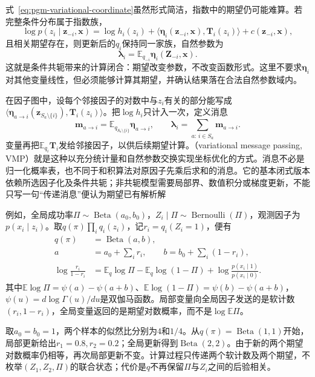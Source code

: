 式~\eqref{eq:pgm-variational-coordinate}虽然形式简洁，指数中的期望仍可能难算。若完整条件分布属于指数族，
\[
  \log p(z_i\mid\bm{z}_{-i},\bm{x})
    =\log h_i(z_i)
      +\langle\bm{\eta}_i(\bm{z}_{-i},\bm{x}),\bm T_i(z_i)\rangle
      +c(\bm{z}_{-i},\bm{x}),
\]
且相关期望存在，则更新后的$q_i$保持同一家族，自然参数为
\begin{equation}
  \bm{\lambda}_i
    =\mathbb E_{q_{-i}}\bm{\eta}_i(\bm{Z}_{-i},\bm{x}).
  \label{eq:pgm-variational-conjugacy}
\end{equation}
这就是条件共轭带来的计算闭合：期望改变参数，不改变函数形式。这里不要求$\bm{\eta}_i$对其他变量线性，但必须能够计算其期望，并确认结果落在合法自然参数域内。

在因子图中，设每个邻接因子的对数中与$z_i$有关的部分能写成$\langle\bm{\eta}_{a\to i}(\bm z_{S_a\setminus\{i\}}),\bm T_i(z_i)\rangle$。把$\log h_i$只计入一次，定义消息
\[
  \bm m_{a\to i}
    =\mathbb E_{q_{S_a\setminus\{i\}}}\bm{\eta}_{a\to i},
  \qquad
  \bm{\lambda}_i=\sum_{a:\,i\in S_a}\bm m_{a\to i}.
\]
变量再把$\mathbb E_{q_i}\bm T_i$发给邻接因子，以供后续期望计算。（variational message passing, VMP）就是这种以充分统计量和自然参数交换实现坐标优化的方式。消息不必是归一化概率表，也不同于和积算法对原因子先乘后求和的消息。它的基本闭式版本依赖所选因子化及条件共轭；非共轭模型需要局部界、数值积分或梯度更新，不能只写一句“传递消息”便认为期望已有解析解

例如，全局成功率$\Pi\sim\operatorname{Beta}(a_0,b_0)$，$Z_i\mid\Pi\sim\operatorname{Bernoulli}(\Pi)$，观测因子为$p(x_i\mid z_i)$。取$q(\pi)\prod_iq_i(z_i)$，记$r_i=q_i(Z_i=1)$，便有
\begin{equation}
  \begin{aligned}
    q(\pi)&=\operatorname{Beta}(a,b),\\
    a&=a_0+\sum_i r_i,\qquad
    b=b_0+\sum_i(1-r_i),\\
    \log\frac{r_i}{1-r_i}
      &=\mathbb E_q\log\Pi-\mathbb E_q\log(1-\Pi)
         +\log\frac{p(x_i\mid1)}{p(x_i\mid0)}.
  \end{aligned}
  \label{eq:pgm-variational-beta-bernoulli}
\end{equation}
其中$\mathbb E\log\Pi=\psi(a)-\psi(a+b)$、$\mathbb E\log(1-\Pi)=\psi(b)-\psi(a+b)$，$\psi(u)=d\log\Gamma(u)/du$是双伽马函数。局部变量向全局因子发送的是软计数$(r_i,1-r_i)$，全局变量返回的是期望对数概率，而不是$\log\mathbb E\Pi$。

取$a_0=b_0=1$，两个样本的似然比分别为$4$和$1/4$。从$q(\pi)=\operatorname{Beta}(1,1)$开始，局部更新给出$r_1=0.8,r_2=0.2$；全局更新得到$\operatorname{Beta}(2,2)$。由于新的两个期望对数概率仍相等，再次局部更新不变。计算过程只传递两个软计数及两个期望，不枚举$(Z_1,Z_2,\Pi)$的联合状态；代价是$q$不再保留$\Pi$与$Z_i$之间的后验相关。


